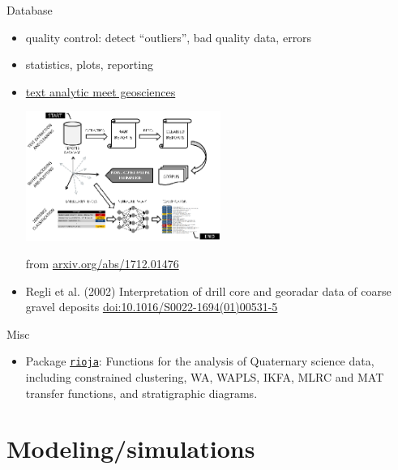 \documentclass[9pt,ignorenonframetext,]{beamer}
\providecommand{\tightlist}{%
  \setlength{\itemsep}{0pt}\setlength{\parskip}{0pt}}
\begin{document}
\begin{frame}{Database}

\begin{itemize}
\item
  quality control: detect ``outliers'', bad quality data, errors
\item
  statistics, plots, reporting
\item
  \href{https://paulhcleverley.com/2017/05/28/text-analytics-meets-geoscience/}{text
  analytic meet geosciences}

  \includegraphics[width=0.50000\textwidth]{imgPres/text_analyse_drilling_report.png}

  from \href{https://arxiv.org/abs/1712.01476}{arxiv.org/abs/1712.01476}
\item
  Regli et al. (2002) Interpretation of drill core and georadar data of
  coarse gravel deposits
  \href{https://doi.org/10.1016/S0022-1694(01)00531-5}{doi:10.1016/S0022-1694(01)00531-5}
\end{itemize}

\end{frame}

\begin{frame}[fragile]{Misc}

\begin{itemize}
\tightlist
\item
  Package
  \href{https://cran.r-project.org/web/packages/rioja/}{\texttt{rioja}}:
  Functions for the analysis of Quaternary science data, including
  constrained clustering, WA, WAPLS, IKFA, MLRC and MAT transfer
  functions, and stratigraphic diagrams.
\end{itemize}

\end{frame}

\section{Modeling/simulations}\label{modelingsimulations}
\end{document}
